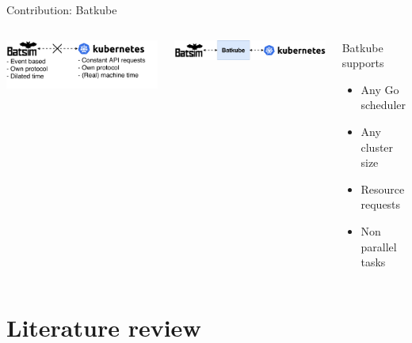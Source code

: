 \documentclass[12pt, aspectratio=43]{beamer}
\begin{document}
\begin{frame}{Contribution: Batkube}
	\begin{columns}
		\includegraphics[width=\textwidth]{../imgs/problematic.pdf}

		\vspace{1cm}

		\includegraphics[width=\textwidth]{../imgs/contribution.pdf}

		\begin{exampleblock}{Batkube supports}
			\begin{itemize}
				\item Any Go scheduler
				\item Any cluster size
				\item Resource requests
				\item Non parallel tasks
			\end{itemize}
		\end{exampleblock}
	\end{columns}
\end{frame}

\section{Literature review}
\end{document}
